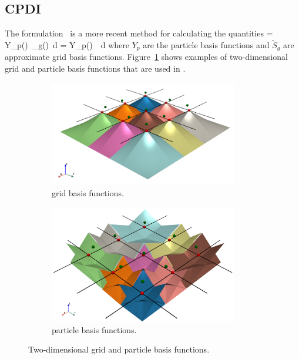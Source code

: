 \subsection{CPDI}
The \CPDI formulation~\cite{Sadeghirad2011} is a more recent method for calculating  
the quantities
\Beq \label{eq:cpdi_int}
    =  \IntOmegap Y_p(\Bx)~_g(\Bx)~d\Omega 
   \quad \Tand \quad
    =  \IntOmegap Y_p(\Bx)~~d\Omega 
\Eeq
where $Y_p$ are the particle basis functions and $\tilde{S}_g$ are approximate
grid basis functions.  Figure~\ref{fig:CPDI} shows examples of two-dimensional grid and 
particle basis functions that are used in \CPDI.
\begin{figure}[htbp!]
  \begin{subfigure}[t]{0.5\textwidth}
    \centering
    \includegraphics[width=0.9\textwidth]{Figs/mpm_basis/cpdi_grid_basis.png}
    \caption{\CPDI grid basis functions.}
  \end{subfigure}
  \begin{subfigure}[t]{0.5\textwidth}
    \centering
    \includegraphics[width=0.9\textwidth]{Figs/mpm_basis/cpdi_particle_basis.png}
    \caption{\CPDI particle basis functions.}
  \end{subfigure}
  \caption{Two-dimensional \CPDI grid and particle basis functions.} 
  \label{fig:CPDI}
\end{figure}

